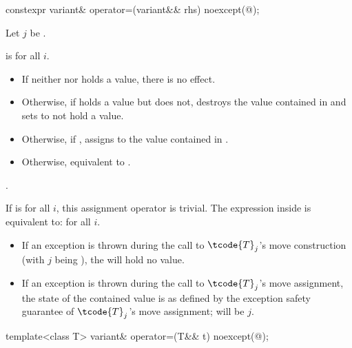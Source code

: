 %
\begin{itemdecl}
constexpr variant& operator=(variant&& rhs) noexcept(@\seebelow@);
\end{itemdecl}

\begin{itemdescr}
\pnum
Let $j$ be .

\pnum
\constraints
{}
 is
 for all $i$.

\pnum
\effects
\begin{itemize}
\item
If neither  nor  holds a value, there is no effect.
\item
Otherwise, if  holds a value but  does not, destroys the value
contained in  and sets  to not hold a value.
\item
Otherwise, if , assigns  to
the value contained in .
\item
Otherwise, equivalent to .
\end{itemize}

\pnum
\returns
{}.

\pnum
\remarks
If 
is  for all $i$, this assignment operator is trivial.
The expression inside  is equivalent to:
 for all $i$.
\begin{itemize}
\item If an exception is thrown during the call to $\tcode{T}_j$'s move construction
(with $j$ being ), the  will hold no value.
\item If an exception is thrown during the call to $\tcode{T}_j$'s move assignment,
the state of the contained value is as defined by the exception safety
guarantee of $\tcode{T}_j$'s move assignment;  will be $j$.
\end{itemize}
\end{itemdescr}

%
\begin{itemdecl}
template<class T> variant& operator=(T&& t) noexcept(@\seebelow@);
\end{itemdecl}


